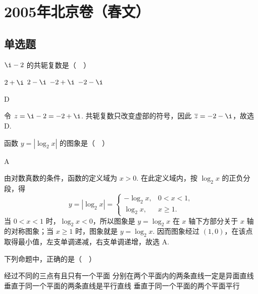 \chapter{2005年北京卷（春文）}
\section{单选题}
\begin{problem}
\(\i-2\) 的共轭复数是（\(\quad\)）

\choices
    {\(2+\i\)}
    {\(2-\i\)}
    {\(-2+\i\)}
    {\(-2-\i\)}
\end{problem}

\begin{answer}
D
\end{answer}

\begin{solution}
令 \(z=\i-2=-2+\i\). 共轭复数只改变虚部的符号，因此 \(\overline z=-2-\i\)，故选 D.
\end{solution}

\begin{problem}
函数 \(y=|\log_2x|\) 的图象是（\(\quad\)）

    {}
    {}
    {}
\end{problem}

\begin{answer}
A
\end{answer}

\begin{solution}
由对数真数的条件，函数的定义域为 \(x>0\). 在此定义域内，按 \(\log_2x\) 的正负分段，得
\[
y=|\log_2x|=\begin{cases}
-\log_2x,&0<x<1,\\
\log_2x,&x\geq 1.
\end{cases}
\]
当 \(0<x<1\) 时，\(\log_2x<0\)，所以图象是 \(y=\log_2x\) 在 \(x\) 轴下方部分关于 \(x\) 轴的对称图象；当 \(x\geq1\) 时，图象就是 \(y=\log_2x\). 因而图象经过 \((1,0)\)，在该点取得最小值，左支单调递减，右支单调递增，故选 A.
\end{solution}

\begin{problem}
下列命题中，正确的是（\(\quad\)）

\choices
    {经过不同的三点有且只有一个平面}
    {分别在两个平面内的两条直线一定是异面直线}
    {垂直于同一个平面的两条直线是平行直线}
    {垂直于同一个平面的两个平面平行}
\end{problem}

